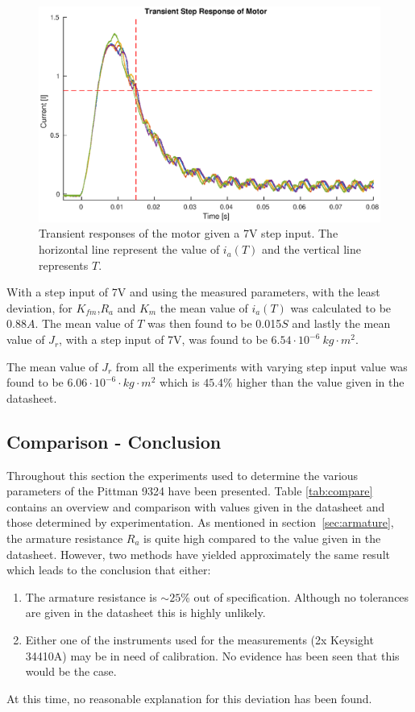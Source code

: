 \begin{figure}[!h]
	\centering
	\includegraphics[width=\linewidth]{graphics/transient_response_inertia}
	\caption{Transient responses of the motor given a 7V step input. The horizontal line represent the value of $i_a(T)$ and the vertical line represents $T$.}
	\label{fig:inertia_trans_plot}
\end{figure}

With a step input of 7V and using the measured parameters, with the least deviation, for $K_{fm}$,$R_a$ and $K_m$ the mean value of $i_a(T)$ was calculated to be 0.88$A$. 
The mean value of $T$ was then found to be 0.015$S$ and lastly the mean value of $J_r$, with a step input of 7V, was found to be $6.54 \cdot 10^{-6}\: kg \cdot m^2$.

\par
The mean value of $J_r$ from all the experiments with varying step input value was found to be $ 6.06 \cdot 10^{-6} \cdot kg \cdot m^2$ which is $45.4\%$ higher than the value given in the datasheet. 

\subsection{Comparison - Conclusion}
Throughout this section the experiments used to determine the various parameters of the Pittman 9324 have been presented.
Table \ref{tab:compare} contains an overview and comparison with values given in the datasheet and those determined by experimentation.
As mentioned in section~\ref{sec:armature}, the armature resistance $R_a$ is quite high compared to the value given in the datasheet.
However, two methods have yielded approximately the same result which leads to the conclusion that either:
\begin{enumerate}
	\item The armature resistance is $\sim25$\% out of specification. 
	Although no tolerances are given in the datasheet this is highly unlikely.
	\item Either one of the instruments used for the measurements (2x Keysight 34410A) may be in need of calibration. 
	No evidence has been seen that this would be the case.
\end{enumerate}
At this time, no reasonable explanation for this deviation has been found.

